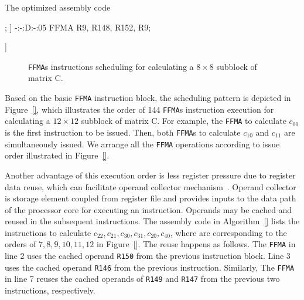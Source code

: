 \documentclass{sig-alternate-05-2015}
\begin{document}
\begin{algorithm}
      \caption{The optimized assembly code }\label{nvcc}
  \begin{algorithmic}[1]
      \footnotesize
        \State [
        \State -:-:D:-:04      FFMA R3, R148, R146, R3;
        \State -:-:-:-:00      LDS.64 R168, [R222+0x400];
        \State ]
        \State -:-:D:-:05      FFMA R9, R148, R152, R9;

        \State ]
  \end{algorithmic}
\end{algorithm}

\begin{figure}[htbp]
\begin{center}
\caption{{\tt FFMA}s instructions scheduling for calculating a $8\times 8$ subblock of matrix C.}
\label{fig:order}
\end{center}
\end{figure}

Based on the basic {\tt FFMA} instruction block, the scheduling pattern is depicted in Figure~\ref{}, which illustrates the order of 144 {\tt FFMA}s instruction execution for calculating a $12\times 12$ subblock of matrix C. For example, the {\tt FFMA} to calculate $c_{00}$ is the first instruction to be issued. Then, both {\tt FFMA}s to calculate $c_{10}$ and  $c_{11}$ are simultaneously issued. We arrange all the {\tt FFMA} operations according to issue order illustrated in Figure~\ref{}.

Another advantage of this execution order is less register pressure due to register data reuse, which can facilitate operand collector mechanism~\cite{}. Operand collector is storage element coupled from register file and provides inputs to the data path of the processor core for executing an instruction. Operands may be cached and reused in the subsequent instructions. The assembly code in Algorithm~\ref{} lists the instructions to calculate $c_{22}, c_{21}, c_{30}, c_{31}, c_{20}, c_{40}$, where are corresponding to the orders of $7,8,9,10,11,12$ in Figure~\ref{}. The reuse happens as follows. The {\tt FFMA} in line 2 uses the cached operand {\tt R150} from the previous instruction block. Line 3 uses the cached operand {\tt R146} from the previous instruction. Similarly, The {\tt FFMA} in line 7 reuses the cached operands of   {\tt R149} and {\tt R147} from the previous two instructions, respectively.
\end{document}
